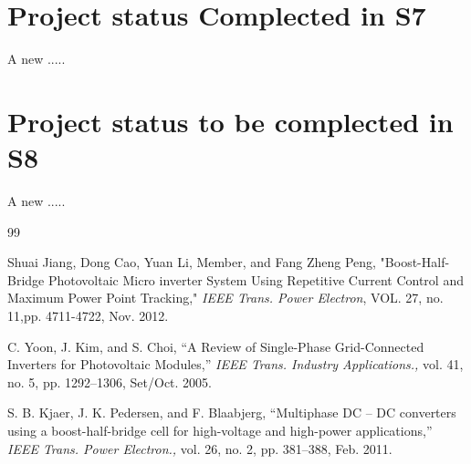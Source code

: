 \documentclass[12 pt, oneside]{book}
\begin{document}
\chapter{Project status Complected in S7}

A new  .....

\chapter{Project status to be complected in S8}

A new  .....
\clearpage
%






\clearpage
{}
\begin{thebibliography}{99}

Shuai Jiang, Dong Cao, Yuan Li, Member, and Fang Zheng Peng, "Boost-Half-Bridge Photovoltaic Micro inverter System Using Repetitive Current Control and Maximum Power Point Tracking," {\em IEEE Trans. Power Electron}, VOL. 27, no. 11,pp. 4711-4722, Nov. 2012.


C. Yoon, J. Kim, and S. Choi, “A Review of Single-Phase Grid-Connected Inverters
for Photovoltaic Modules,” {\em IEEE Trans. Industry Applications.,} vol. 41, no. 5, pp. 1292–1306, Set/Oct. 2005.

S. B. Kjaer, J. K. Pedersen, and F. Blaabjerg, “Multiphase DC – DC converters using a boost-half-bridge cell for high-voltage and high-power applications,” {\em IEEE Trans. Power Electron.,} vol. 26, no. 2, pp. 381–388, Feb. 2011.


\end{thebibliography}
\end{document}
